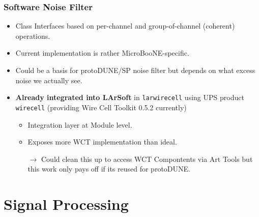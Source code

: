 \documentclass[xcolor=dvipsnames]{beamer}
\begin{document}
\begin{frame}
  \frametitle{Software Noise Filter}
  \begin{itemize}
  \item Class Interfaces based on per-channel and group-of-channel
    (coherent) operations.
  \item Current implementation is rather MicroBooNE-specific.
  \item Could be a basis for protoDUNE/SP noise filter but depends on
    what excess noise we actually see.
  \item \textbf{Already integrated into LArSoft} in \texttt{larwirecell} using UPS product \texttt{wirecell} (providing Wire Cell Toolkit 0.5.2 currently)
    \begin{itemize}\footnotesize
    \item Integration layer at Module level.
    \item Exposes more WCT implementation than ideal.
    \item[$\to$] Could clean this up to access WCT Compontents via Art
      Tools but this work only pays off if its reused for protoDUNE.
    \end{itemize}
  \end{itemize}
\end{frame}

\section{Signal Processing}
\end{document}
